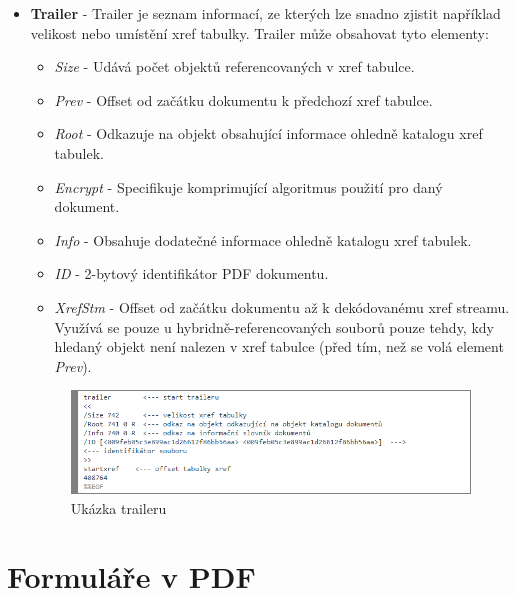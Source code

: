 \begin{itemize}
	\item \textbf{Trailer} -  Trailer je seznam informací, ze kterých lze snadno zjistit například velikost nebo umístění xref tabulky. Trailer může obsahovat tyto elementy:
	\begin{itemize}
		\item \textit{Size} - Udává počet objektů referencovaných v xref tabulce. 
		\item \textit{Prev} - Offset od začátku dokumentu k předchozí xref tabulce.
		\item \textit{Root} - Odkazuje na objekt obsahující informace ohledně katalogu xref tabulek.
		\item \textit{Encrypt} - Specifikuje komprimující algoritmus použití pro daný dokument.
		\item \textit{Info} - Obsahuje dodatečné informace ohledně katalogu xref tabulek.
		\item \textit{ID} - 2-bytový identifikátor PDF dokumentu.
		\item \textit{XrefStm} - Offset od začátku dokumentu až k dekódovanému xref streamu. Využívá se pouze u hybridně-referencovaných souborů pouze tehdy, kdy hledaný objekt není nalezen v xref tabulce (před tím, než se volá element \textit{Prev}). 
	\end{itemize}
	\begin{figure}[h!]
	\centering
	\includegraphics[width=12cm]{img/pdf_trailer}
	\caption{Ukázka traileru}
	\label{fig:pdf_trailer}
	\end{figure}
\end{itemize}
\section{Formuláře v PDF}